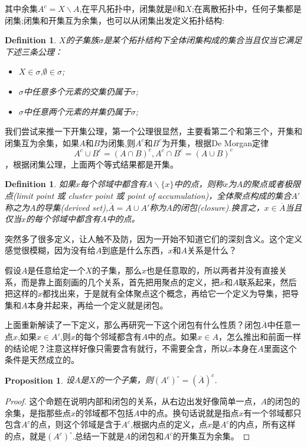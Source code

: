 \documentclass{article}
\newtheorem{proposition}[theorem]{Proposition}
\newtheorem{definition}[theorem]{Definition}
\begin{document}
其中余集$A^{c}= X \smallsetminus A$,在平凡拓扑中，闭集就是$\emptyset$和$X$;在离散拓扑中，任何子集都是闭集;闭集和开集互为余集，也可以从闭集出发定义拓扑结构:

\begin{definition}
$X$的子集族$\sigma$是某个拓扑结构下全体闭集构成的集合当且仅当它满足下述三条公理：
\begin{itemize}
	\item $X \in \sigma$,$\emptyset \in \sigma$;
	\item $\sigma$中任意多个元素的交集仍属于$\sigma$;
	\item $\sigma$中任意两个元素的并集仍属于$\sigma$;
\end{itemize}
\end{definition}

我们尝试来推一下开集公理，第一个公理很显然，主要看第二个和第三个，开集和闭集互为余集，如果$A$和$B$为闭集,则$A^c$和$B^c$为开集，根据De Morgan定律\[A^c \cup B^c = (A \cap B)^c , A^c \cap B^c = (A \cup B)^c\]，根据闭集公理，上面两个等式结果都是开集。

\begin{definition}
如果$x$每个邻域中都含有$A \smallsetminus \{x\}$中的点，则称$x$为$A$的聚点或者极限点(limit point 或 cluster point 或 point of accumulation)，全体聚点构成的集合$A'$称之为$A$的导集(derived set),$\overline{A}=A \cup A'$称为$A$的闭包(closure).换言之，$x \in \overline{A}$当且仅当$x$的每个邻域中都含有$A$中的点。
\end{definition}

突然多了很多定义，让人触不及防，因为一开始不知道它们的深刻含义。这个定义感觉很模糊，因为没有给$A$到底是什么东西，$x$和$A$关系是什么？

假设$A$是任意给定一个$X$的子集，那么$x$也是任意取的，所以两者并没有直接关系，而是靠上面刻画的几个关系，首先把用聚点的定义，把$x$和$A$联系起来，然后把这样的$x$都找出来，于是就有全体聚点这个概念，再给它一个定义为导集，把导集和$A$本身并起来，再给一个定义就是闭包。

上面重新解读了一下定义，那么再研究一下这个闭包有什么性质？闭包$\overline{A}$中任意一点$x$,如果$x \in A'$,则$x$的每个邻域都含有$A$中的点。如果$x \in A$，怎么推出和前面一样的结论呢？注意这样好像只需要含有就行，不需要全含，所以$x$本身在$A$里面这个条件是天然成立的。

\begin{proposition}
设$A$是$X$的一个子集，则$(A^{c})^{\circ}=(\overline{A})^c$.
\end{proposition}

\begin{proof}
这个命题在说明内部和闭包的关系，从右边出发好像简单一点，$A$的闭包的余集，是指那些点$x$的邻域都不包括$A$中的点。换句话说就是指点$x$有一个邻域都只包含$A^c$的点，则这个邻域是含于$A^c$,根据内点的定义，点$x$是$A^c$的内点，所有这样的点，就是$(A^c)^{\circ}$.总结一下就是$A$的闭包和$A^c$的开集互为余集。	
\end{proof}
\end{document}
